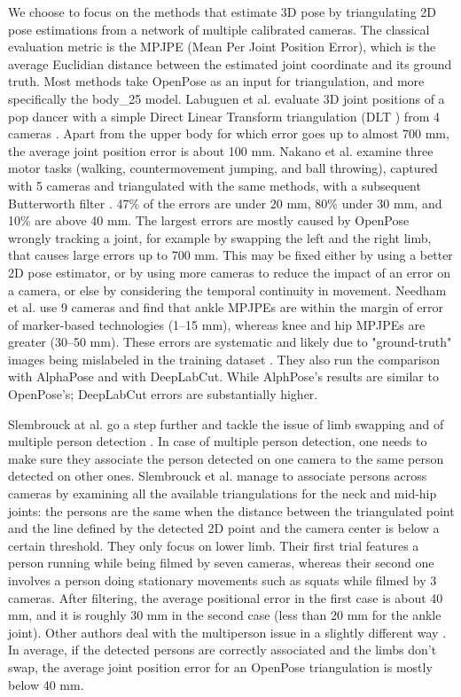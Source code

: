 We choose to focus on the methods that estimate 3D pose by triangulating 2D pose estimations from a network of multiple calibrated cameras. The classical evaluation metric is the MPJPE (Mean Per Joint Position Error), which is the average Euclidian distance between the estimated joint coordinate and its ground truth. Most methods take OpenPose as an input for triangulation, and more specifically the body\_25 model. Labuguen et al. evaluate 3D joint positions of a pop dancer with a simple Direct Linear Transform triangulation (DLT \cite{Hartley1997,Miller1980}) from 4 cameras \cite{Labuguen2020}. Apart from the upper body for which error goes up to almost 700 mm, the average joint position error is about 100 mm. Nakano et al. examine three motor tasks (walking, countermovement jumping, and ball throwing), captured with 5 cameras and triangulated with the same methods, with a subsequent Butterworth filter \cite{Nakano2019}. 47\% of the errors are under 20 mm, 80\% under 30 mm, and 10\% are above 40 mm. The largest errors are mostly caused by OpenPose wrongly tracking a joint, for example by swapping the left and the right limb, that causes large errors up to 700 mm. This may be fixed either by using a better 2D pose estimator, or by using more cameras to reduce the impact of an error on a camera, or else by considering the temporal continuity in movement. Needham et al. use 9 cameras and find that ankle MPJPEs are within the margin of error of marker-based technologies (1–15 mm), whereas knee and hip MPJPEs are greater (30–50 mm). These errors are systematic and likely due to "ground-truth" images being mislabeled in the training dataset \cite{Needham2021b}. They also run the comparison with AlphaPose and with DeepLabCut. While AlphPose's results are similar to OpenPose’s; DeepLabCut errors are substantially higher.

Slembrouck at al. go a step further and tackle the issue of limb swapping and of multiple person detection \cite{Slembrouck2020}. In case of multiple person detection, one needs to make sure they associate the person detected on one camera to the same person detected on other ones. Slembrouck et al. manage to associate persons across cameras by examining all the available triangulations for the neck and mid-hip joints: the persons are the same when the distance between the triangulated point and the line defined by the detected 2D point and the camera center is below a certain threshold. They only focus on lower limb. Their first trial features a person running while being filmed by seven cameras, whereas their second one involves a person doing stationary movements such as squats while filmed by 3 cameras. After filtering, the average positional error in the first case is about 40 mm, and it is roughly 30 mm in the second case (less than 20 mm for the ankle joint). Other authors deal with the multiperson issue in a slightly different way \cite{Bridgeman2019,Chu2021,Dong2019}. In average, if the detected persons are correctly associated and the limbs don’t swap, the average joint position error for an OpenPose triangulation is mostly below 40 mm.

